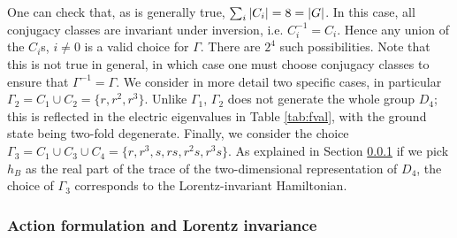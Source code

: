 One can check that, as is generally true, $\sum_i \abs{C_i}=8=\abs{G}$.
In this case, all conjugacy classes are invariant under inversion, i.e.
$C_i^{-1}=C_i$.
 Hence any union of the $C_i$s, $i \neq 0$ is a valid choice for $\Gamma$.
There are $2^4$ such possibilities.
Note that this is not true in general, in which case one must choose conjugacy classes to ensure that $\Gamma^{-1}=\Gamma$.
We consider in more detail two specific cases, in particular $\Gamma_2 = C_1 \cup C_2 = \{r, r^2, r^3\}$.
Unlike $\Gamma_1$, $\Gamma_2$ does not generate the whole group $D_4$; this is reflected in the electric eigenvalues in Table \ref{tab:fval}, with the ground state being two-fold degenerate.
Finally, we consider the choice $\Gamma_3=C_1 \cup C_3 \cup C_4=\{r, r^3, s, rs, r^2s, r^3s\}$.
As explained in Section \ref{sec:action formulation} if we pick $h_B$ as the real part of the trace of the two-dimensional representation of $D_4$, the choice of $\Gamma_3$ corresponds to the Lorentz-invariant Hamiltonian.

\subsubsection{Action formulation and Lorentz invariance}\label{sec:action formulation}

